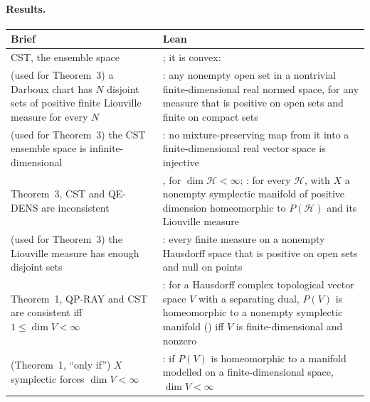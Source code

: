 \documentclass[11pt]{article}
\begin{document}
\paragraph{Results.}
\begin{center}
\begin{tabularx}{\textwidth}{@{}BL@{}}
\toprule
Brief & Lean \\
\midrule
CST, the ensemble space & ; it is convex:
   \\
(used for Theorem~3) a Darboux chart has $N$ disjoint sets of positive finite Liouville measure
  for every $N$ & : any nonempty open set in a nontrivial
  finite-dimensional real normed space, for any measure that is positive on open sets and finite
  on compact sets \\
(used for Theorem~3) the CST ensemble space is infinite-dimensional &
  : no mixture-preserving map from it into a finite-dimensional real
  vector space is injective \\
Theorem~3, CST and QE-DENS are inconsistent & , for
  $\dim\mathcal H < \infty$; : for every
  $\mathcal H$, with $X$ a nonempty symplectic manifold of positive dimension homeomorphic to
  $P(\mathcal H)$ and its Liouville measure \\
(used for Theorem~3) the Liouville measure has enough disjoint sets &
  : every finite measure on a nonempty Hausdorff
  space that is positive on open sets and null on points \\
Theorem~1, QP-RAY and CST are consistent iff $1 \le \dim V < \infty$ & : for
  a Hausdorff complex topological vector space $V$ with a separating dual, $P(V)$ is homeomorphic
  to a nonempty symplectic manifold () iff $V$ is finite-dimensional and nonzero \\
(Theorem~1, ``only if'') $X$ symplectic forces $\dim V < \infty$ &
  : if $P(V)$ is homeomorphic to a manifold modelled on a
  finite-dimensional space, $\dim V < \infty$ \\
\bottomrule
\end{tabularx}
\end{center}
\end{document}
